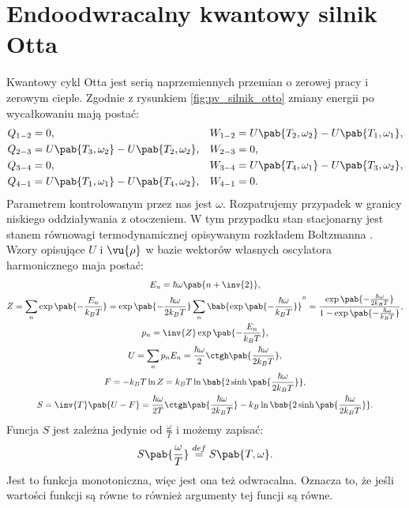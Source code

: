 
\section{Endoodwracalny kwantowy silnik Otta}
Kwantowy cykl Otta jest serią naprzemiennych przemian o zerowej pracy i zerowym cieple. Zgodnie z rysunkiem \ref{fig:pv_silnik_otto} zmiany energii po wycałkowaniu mają postać:
\begin{align*}
	Q_{1-2} &= 0, &
	W_{1-2} &= U\pab{T_2,\omega_2} - U\pab{T_1,\omega_1}, \\
	Q_{2-3} &= U\pab{T_3,\omega_2} - U\pab{T_2,\omega_2}, &
	W_{2-3} &= 0, \\
	Q_{3-4} &= 0, &
	W_{3-4} &= U\pab{T_4,\omega_1} - U\pab{T_3,\omega_2}, \\
	Q_{4-1} &= U\pab{T_1,\omega_1} - U\pab{T_4,\omega_2}, &
	W_{4-1} &= 0.
\end{align*}
Parametrem kontrolowanym przez nas jest \(\omega\). Rozpatrujemy przypadek w granicy niskiego oddziaływania z otoczeniem. W tym przypadku stan stacjonarny jest stanem równowagi termodynamicznej opisywanym rozkładem Boltzmanna \cite{endo_otto}. Wzory opisujące \(U\) i \(\vu{\rho}\) w bazie wektorów własnych oscylatora harmonicznego maja postać:
\begin{gather*}
	E_n = \hbar\omega\pab{n + \inv{2}}, \\
	Z = \sum_n \exp\pab{-\frac{E_n}{k_B T}} =
	\exp\pab{-\frac{\hbar\omega}{2 k_B T}} \sum_n \bab{\exp\pab{-\frac{\hbar\omega}{k_B T}}}^n =
	\frac{\exp\pab{-\frac{\hbar\omega}{2 k_B T}}}{1-\exp\pab{-\frac{\hbar\omega}{k_B T}}}, \\
	p_n = \inv{Z} \exp\pab{-\frac{E_n}{k_B T}}, \\
	U = \sum_n p_n E_n = \frac{\hbar\omega}{2} \ctgh\pab{\frac{\hbar\omega}{2k_B T}}, \\
	F = - k_B T \ln Z = k_B T \ln\bab{2\sinh\pab{\frac{\hbar\omega}{2k_B T}}}, \\
	S = \inv{T}\pab{U-F} = \frac{\hbar\omega}{2T} \ctgh\pab{\frac{\hbar\omega}{2k_B T}} - k_B \ln\bab{2\sinh\pab{\frac{\hbar\omega}{2k_B T}}}.
\end{gather*}
Funcja \(S\) jest zależna jedynie od \(\frac{\omega}{T}\) i możemy zapisać:
\begin{equation*}
	S\pab{\frac{\omega}{T}} \overset{def}{=} S\pab{T,\omega}.
\end{equation*}
Jest to funkcja monotoniczna, więc jest ona też odwracalna. Oznacza to, że jeśli wartości funkcji są równe to również argumenty tej funcji są równe.

